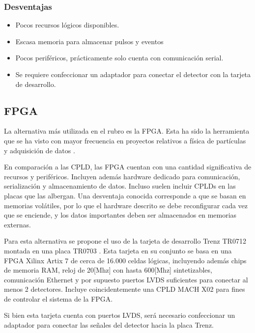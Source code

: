 \subsubsection*{Desventajas}
\begin{itemize}
	\item Pocos recursos lógicos disponibles.
	\item Escasa memoria para almacenar pulsos y eventos
	\item Pocos periféricos, prácticamente solo cuenta con comunicación serial.
	\item Se requiere confeccionar un adaptador para conectar el detector con la tarjeta de desarrollo.
\end{itemize}

\newpage
\subsection{FPGA}
\par La alternativa más utilizada en el rubro es la FPGA. Esta ha sido la herramienta que se ha visto con mayor frecuencia en proyectos relativos a física de partículas y adquisición de datos \cite{Gonzalez2020EstadoTitulacion}. 
\par En comparación a las CPLD, las FPGA cuentan con una cantidad significativa de recursos y periféricos. Incluyen además hardware dedicado para comunicación, serialización y almacenamiento de datos. Incluso suelen incluir CPLDs en las placas que las albergan. Una desventaja conocida corresponde a que se basan en memorias volátiles, por lo que el hardware descrito se debe reconfigurar cada vez que se enciende, y los datos importantes deben ser almacenados en memorias externas.

\par Para esta alternativa se propone el uso de la tarjeta de desarrollo Trenz TR0712 \cite{TrenzElectronic2019TR07012Wiki} montada en una placa TR0703 \cite{TrenzElectronic2019TR0703Wiki}. Esta tarjeta en su conjunto se basa en una FPGA Xilinx Artix 7 \cite{Xilinx20107DS180} de cerca de 16.000 celdas lógicas, incluyendo además chips de memoria RAM, reloj de 20[Mhz] con hasta 600[Mhz] sintetizables, comunicación Ethernet y por supuesto puertos LVDS suficientes para conectar al menos 2 detectores. Incluye coincidentemente una CPLD MACH X02 para fines de controlar el sistema de la FPGA.

\par Si bien esta tarjeta cuenta con puertos LVDS, será necesario confeccionar un adaptador para conectar las señales del detector hacia la placa Trenz.

